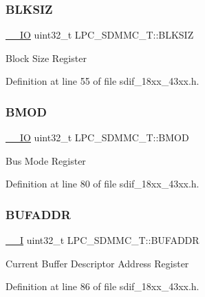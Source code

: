 \subsubsection{\texorpdfstring{B\+L\+K\+S\+IZ}{BLKSIZ}}
{\footnotesize\ttfamily \hyperlink{core__sc300_8h_aec43007d9998a0a0e01faede4133d6be}{\+\_\+\+\_\+\+IO} uint32\+\_\+t L\+P\+C\+\_\+\+S\+D\+M\+M\+C\+\_\+\+T\+::\+B\+L\+K\+S\+IZ}

Block Size Register 

Definition at line 55 of file sdif\+\_\+18xx\+\_\+43xx.\+h.

\mbox{\label{struct_l_p_c___s_d_m_m_c___t_a31d2a920d865a8fb0905448222ec8d6e}} 
\subsubsection{\texorpdfstring{B\+M\+OD}{BMOD}}
{\footnotesize\ttfamily \hyperlink{core__sc300_8h_aec43007d9998a0a0e01faede4133d6be}{\+\_\+\+\_\+\+IO} uint32\+\_\+t L\+P\+C\+\_\+\+S\+D\+M\+M\+C\+\_\+\+T\+::\+B\+M\+OD}

Bus Mode Register 

Definition at line 80 of file sdif\+\_\+18xx\+\_\+43xx.\+h.

\mbox{\label{struct_l_p_c___s_d_m_m_c___t_a330db89ebea4b6cfbdfa440390361a8a}} 
\subsubsection{\texorpdfstring{B\+U\+F\+A\+D\+DR}{BUFADDR}}
{\footnotesize\ttfamily \hyperlink{core__sc300_8h_af63697ed9952cc71e1225efe205f6cd3}{\+\_\+\+\_\+I} uint32\+\_\+t L\+P\+C\+\_\+\+S\+D\+M\+M\+C\+\_\+\+T\+::\+B\+U\+F\+A\+D\+DR}

Current Buffer Descriptor Address Register 

Definition at line 86 of file sdif\+\_\+18xx\+\_\+43xx.\+h.

\mbox{\label{struct_l_p_c___s_d_m_m_c___t_a09af8ae4bca60a2ff93096b8b28be553}} 
